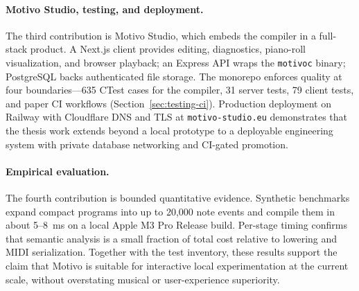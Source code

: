\paragraph{Motivo Studio, testing, and deployment.}
The third contribution is Motivo Studio, which embeds the compiler in a full-stack product.
A Next.js client provides editing, diagnostics, piano-roll visualization, and browser playback; an Express API wraps
the \texttt{motivoc} binary; PostgreSQL backs authenticated file storage.
The monorepo enforces quality at four boundaries---635 CTest cases for the compiler, 31 server tests, 79 client tests,
and paper CI workflows (Section~\ref{sec:testing-ci}).
Production deployment on Railway with Cloudflare DNS and TLS at \texttt{motivo-studio.eu} demonstrates that the thesis
work extends beyond a local prototype to a deployable engineering system with private database networking and
CI-gated promotion.

\paragraph{Empirical evaluation.}
The fourth contribution is bounded quantitative evidence.
Synthetic benchmarks expand compact programs into up to 20,000 note events and compile them in about 5--8~ms on a local
Apple M3 Pro Release build.
Per-stage timing confirms that semantic analysis is a small fraction of total cost relative to lowering and MIDI
serialization.
Together with the test inventory, these results support the claim that Motivo is suitable for interactive local
experimentation at the current scale, without overstating musical or user-experience superiority.
